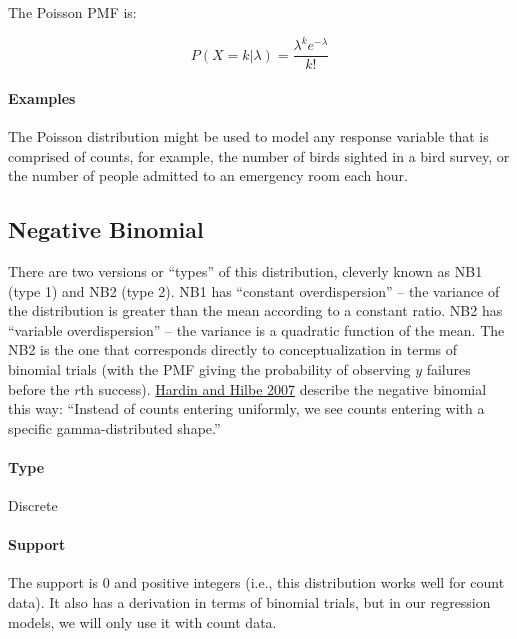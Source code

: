 \documentclass[]{book}
\let\oldparagraph\paragraph
\renewcommand{\paragraph}[1]{\oldparagraph{#1}\mbox{}}
\begin{document}
The Poisson PMF is:

\[P(X=k \vert \lambda) = \frac{\lambda^k e^{-\lambda}}{k!}\]

\hypertarget{examples-4}{%
\paragraph{Examples}\label{examples-4}}

The Poisson distribution might be used to model any response variable that is comprised of counts, for example, the number of birds sighted in a bird survey, or the number of people admitted to an emergency room each hour.

\hypertarget{negative-binomial}{%
\subsection{Negative Binomial}\label{negative-binomial}}

There are two versions or ``types'' of this distribution, cleverly known as NB1 (type 1) and NB2 (type 2). NB1 has ``constant overdispersion'' -- the variance of the distribution is greater than the mean according to a constant ratio. NB2 has ``variable overdispersion'' -- the variance is a quadratic function of the mean. The NB2 is the one that corresponds directly to conceptualization in terms of binomial trials (with the PMF giving the probability of observing \(y\) failures before the \(r\)th success). \href{https://www.amazon.com/Generalized-Linear-Models-Extensions-Third/dp/1597181056/ref=sr_1_1?s=books\&ie=UTF8\&qid=1538705158\&sr=1-1\&keywords=Generalized+Linear+Models+and+Extensions\%3A+third+edition}{Hardin and Hilbe 2007} describe the negative binomial this way: ``Instead of counts entering uniformly, we see counts entering with a specific gamma-distributed shape.''

\hypertarget{type-5}{%
\paragraph{Type}\label{type-5}}

Discrete

\hypertarget{support-5}{%
\paragraph{Support}\label{support-5}}

The support is 0 and positive integers (i.e., this distribution works well for count data). It also has a derivation in terms of binomial trials, but in our regression models, we will only use it with count data.
\end{document}
